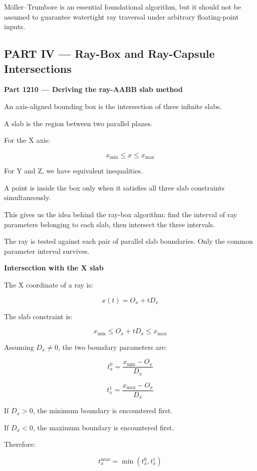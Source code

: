 Möller--Trumbore is an essential foundational algorithm, but it should not be assumed to guarantee watertight ray traversal under arbitrary floating-point inputs.

\subsection{PART IV --- Ray-Box and Ray-Capsule Intersections}\label{04-visual-computing-ii-ch024-part-iv-ray-box-and-ray-capsule-intersections}

\hypertarget{04-visual-computing-ii-ch024-part-iv-ray-box-and-ray-capsule-intersections}{}

\textbf{Part 1210 --- Deriving the ray-AABB slab method}

An axis-aligned bounding box is the intersection of three infinite slabs.

A slab is the region between two parallel planes.

For the X axis:

\[
x_{\min}\le x\le x_{\max}
\]

For Y and Z, we have equivalent inequalities.

A point is inside the box only when it satisfies all three slab constraints simultaneously.

This gives us the idea behind the ray-box algorithm: find the interval of ray parameters belonging to each slab, then intersect the three intervals.

The ray is tested against each pair of parallel slab boundaries. Only the common parameter interval survives.

\textbf{Intersection with the X slab}

The X coordinate of a ray is:

\[
x(t)=O_x+tD_x
\]

The slab constraint is:

\[
x_{\min}\le O_x+tD_x\le x_{\max}
\]

Assuming \(D_x\ne0\), the two boundary parameters are:

\[
\boxed{ t_x^0=\frac{x_{\min}-O_x}{D_x} }
\]

\[
\boxed{ t_x^1=\frac{x_{\max}-O_x}{D_x} }
\]

If \(D_x>0\), the minimum boundary is encountered first.

If \(D_x<0\), the maximum boundary is encountered first.

Therefore:

\[
\boxed{ t_x^{\mathrm{near}}=\min(t_x^0,t_x^1) }
\]

